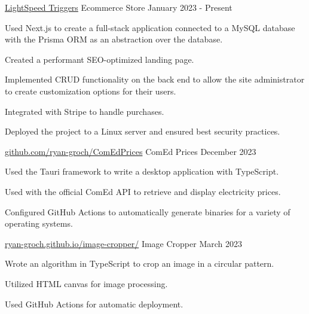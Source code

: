 

\begin{cventries}

  \cventry
    {\href{https://lightspeedtriggers.com}{LightSpeed Triggers}} %
    {Ecommerce Store} %
    {January 2023 - Present} %
    {} %
    {
      \begin{cvitems} %
        \item {Used Next.js to create a full-stack application connected to a MySQL database with the Prisma ORM as an abstraction over the database.}
        \item {Created a performant SEO-optimized landing page.}
        \item {Implemented CRUD functionality on the back end to allow the site administrator to create customization options for their users.}
        \item {Integrated with Stripe to handle purchases.}
        \item {Deployed the project to a Linux server and ensured best security practices.}
      \end{cvitems}
    }


  \cventry
  {\href{https://github.com/ryan-groch/ComEdPrices}{github.com/ryan-groch/ComEdPrices}} %
  {ComEd Prices} %
  {December 2023} %
  {} %
  {
    \begin{cvitems} %
      \item {Used the Tauri framework to write a desktop application with TypeScript.}
      \item {Used with the official ComEd API to retrieve and display electricity prices.}
      \item {Configured GitHub Actions to automatically generate binaries for a variety of operating systems.}
    \end{cvitems}
  }

\cventry
{\href{https://ryan-groch.github.io/image-cropper/}{ryan-groch.github.io/image-cropper/}} %
{Image Cropper} %
{March 2023} %
{} %
{
  \begin{cvitems} %
    \item {Wrote an algorithm in TypeScript to crop an image in a circular pattern.}
    \item {Utilized HTML canvas for image processing.}
    \item {Used GitHub Actions for automatic deployment.}
  \end{cvitems}
}


\end{cventries}
